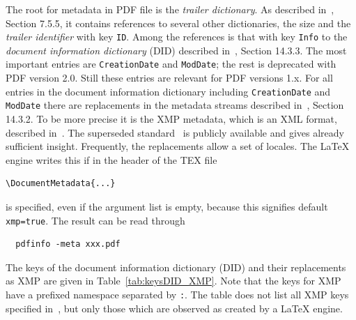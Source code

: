 \documentclass[a4paper]{article}%
\begin{document}
The root for metadata in PDF file is the \emph{trailer dictionary}. 
As described in~\cite{Pdf20}, Section 7.5.5, 
it contains references to several other dictionaries, 
the size and the \emph{trailer identifier} with key \texttt{ID}. 
Among the references is that with key \texttt{Info} 
to the \emph{document information dictionary} (DID) described in~\cite{Pdf20}, Section 14.3.3. 
The most important entries are \texttt{CreationDate} and \texttt{ModDate}; 
the rest is deprecated with PDF version 2.0. 
Still these entries are relevant for PDF versions 1.x. 
For all entries in the document information dictionary including \texttt{CreationDate} and \texttt{ModDate} 
there are replacements in the metadata streams described in~\cite{Pdf20}, Section 14.3.2. 
To be more precise it is the XMP metadata, which is an XML format, described in~\cite{ISO16684-1:19}. 
The superseded standard~\cite{ISO16684-1:12} is publicly available 
and gives already sufficient insight. 
Frequently, the replacements allow a set of locales. 
The \LaTeX{} engine writes this if in the header of the TEX file 
%
\begin{verbatim}
\DocumentMetadata{...}
\end{verbatim}
%
is specified, even if the argument list is empty, because this signifies default \texttt{xmp=true}. 
The result can be read through 
%
\begin{verbatim}
  pdfinfo -meta xxx.pdf
\end{verbatim}

The keys of the document information dictionary (DID) 
and their replacements as XMP are given in Table~\ref{tab:keysDID_XMP}. 
Note that the keys for XMP have a prefixed namespace separated by \texttt{:}. 
The table does not list all XMP keys specified in~\cite{ISO16684-1:19}, 
but only those which are observed as created by a \LaTeX{} engine. 
\end{document}
